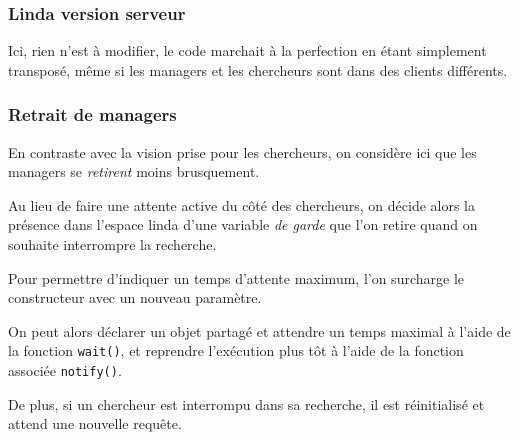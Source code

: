 \documentclass[headings=standardclasses,parskip=half]{scrartcl}
\begin{document}
\subsubsection{Linda version serveur}

Ici, rien n'est à modifier, le code marchait à la perfection en étant simplement transposé,
même si les managers et les chercheurs sont dans des clients différents.

\subsubsection{Retrait de managers}

En contraste avec la vision prise pour les chercheurs, on considère ici que les managers se \textit{retirent}
moins brusquement.

Au lieu de faire une attente active du côté des chercheurs, on décide alors la présence dans
l'espace linda d'une variable \textit{de garde} que l'on retire quand on souhaite interrompre la recherche.

Pour permettre d'indiquer un temps d'attente maximum, l'on surcharge le constructeur avec un nouveau
paramètre.

On peut alors déclarer un objet partagé et attendre un temps maximal à l'aide de la fonction \texttt{wait()},
et reprendre l'exécution plus tôt à l'aide de la fonction associée \texttt{notify()}.

De plus, si un chercheur est interrompu dans sa recherche, il est réinitialisé et attend une nouvelle
requête.
\end{document}
